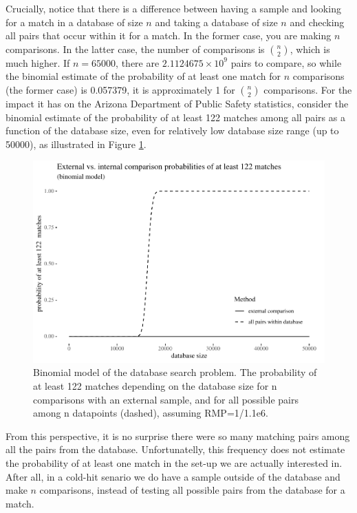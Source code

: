 \documentclass[
  10pt,
  dvipsnames,enabledeprecatedfontcommands]{scrartcl}
\begin{document}
Crucially, notice that there is a difference between having a sample and
looking for a match in a database of size \(n\) and taking a database of
size \(n\) and checking all pairs that occur within it for a match. In
the former case, you are making \(n\) comparisons. In the latter case,
the number of comparisons is \({n \choose 2}\), which is much higher. If
\(n=65000\), there are \ensuremath{2.1124675\times 10^{9}} pairs to
compare, so while the binomial estimate of the probability of at least
one match for \(n\) comparisons (the former case) is 0.057379, it is
approximately 1 for \({n \choose 2}\) comparisons. For the impact it has
on the Arizona Department of Public Safety statistics, consider the
binomial estimate of the probability of at least 122 matches among all
pairs as a function of the database size, even for relatively low
database size range (up to 50000), as illustrated in Figure
\ref{fig:Arizona}.

\begin{figure}[h]

\begin{center}\includegraphics[width=1\linewidth]{lr-chapter3_files/figure-latex/fig-Arizona-1} \end{center}
\caption{Binomial model of the database search problem. The probability of at least 122 matches depending on the database size for n comparisons with an external sample, and for all possible pairs among n datapoints (dashed), assuming RMP=1/1.1e6.}
\label{fig:Arizona}
\end{figure}

From this perspective, it is no surprise there were so many matching
pairs among all the pairs from the database. Unfortunatelly, this
frequency does not estimate the probability of at least one match in the
set-up we are actually interested in. After all, in a cold-hit senario
we do have a sample outside of the database and make \(n\) comparisons,
instead of testing all possible pairs from the database for a match.
\end{document}
